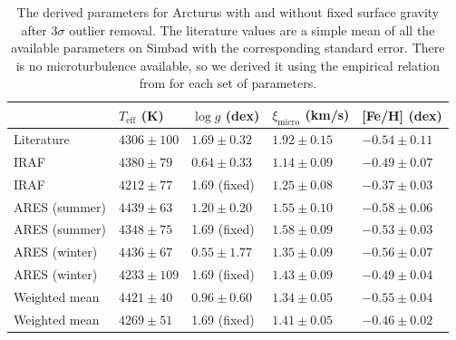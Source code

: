 \documentclass{aa}
\begin{document}
\begin{table}[htb!]
    \caption{The derived parameters for Arcturus with and without fixed surface
             gravity after 3$\sigma$ outlier removal. The literature values are
             a simple mean of all the available parameters on Simbad with the
             corresponding standard error. There is no microturbulence
             available, so we derived it using the empirical relation
             from \citet{Adibekyan2015} for each set of parameters.}
    \label{tab:arcturus}
    \centering
    \begin{tabular}{lllll}
      \hline\hline
                      & $T_\mathrm{eff}$ (K) &  $\log g$ (dex)  &   $\xi_\mathrm{micro}$ (km/s)   & [Fe/H] (dex)     \\
      \hline
        Literature    & $4306 \pm 100$       &  $1.69 \pm 0.32$ &    $1.92 \pm 0.15$              & $-0.54 \pm 0.11$ \\
      \hline
        IRAF          & $4380 \pm  79$       &  $0.64 \pm 0.33$ &    $1.14 \pm 0.09$              & $-0.49 \pm 0.07$ \\
        IRAF          & $4212 \pm  77$       &   1.69 (fixed)   &    $1.25 \pm 0.08$              & $-0.37 \pm 0.03$ \\
      \hline
        ARES (summer) & $4439 \pm  63$       &  $1.20 \pm 0.20$ &    $1.55 \pm 0.10$              & $-0.58 \pm 0.06$ \\
        ARES (summer) & $4348 \pm  75$       &   1.69 (fixed)   &    $1.58 \pm 0.09$              & $-0.53 \pm 0.03$ \\
        ARES (winter) & $4436 \pm  67$       &  $0.55 \pm 1.77$ &    $1.35 \pm 0.09$              & $-0.56 \pm 0.07$ \\
        ARES (winter) & $4233 \pm 109$       &   1.69 (fixed)   &    $1.43 \pm 0.09$              & $-0.49 \pm 0.04$ \\
      \hline
        Weighted mean & $4421 \pm  40$       &  $0.96 \pm 0.60$ &    $1.34 \pm 0.05$              & $-0.55 \pm 0.04$ \\
        Weighted mean & $4269 \pm  51$       &   1.69 (fixed)   &    $1.41 \pm 0.05$              & $-0.46 \pm 0.02$ \\
      \hline
    \end{tabular}
\end{table}
\end{document}
